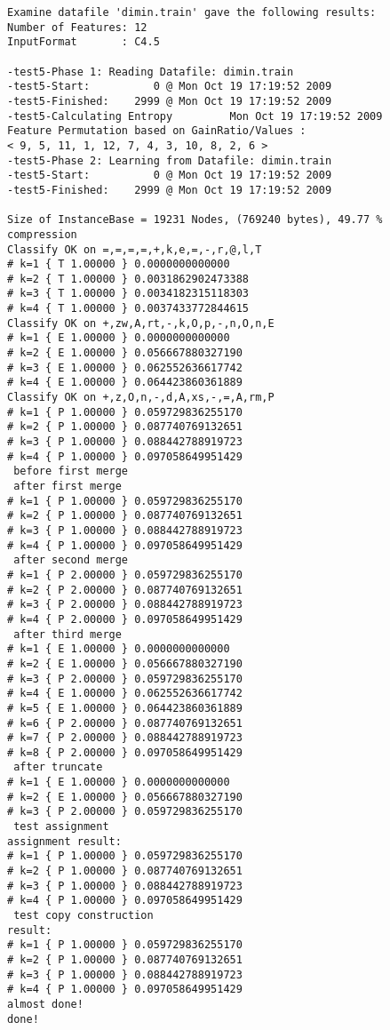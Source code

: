 \documentclass{report}
\begin{document}
\begin{footnotesize}
\begin{verbatim}
Examine datafile 'dimin.train' gave the following results:
Number of Features: 12
InputFormat       : C4.5

-test5-Phase 1: Reading Datafile: dimin.train
-test5-Start:          0 @ Mon Oct 19 17:19:52 2009
-test5-Finished:    2999 @ Mon Oct 19 17:19:52 2009
-test5-Calculating Entropy         Mon Oct 19 17:19:52 2009
Feature Permutation based on GainRatio/Values :
< 9, 5, 11, 1, 12, 7, 4, 3, 10, 8, 2, 6 >
-test5-Phase 2: Learning from Datafile: dimin.train
-test5-Start:          0 @ Mon Oct 19 17:19:52 2009
-test5-Finished:    2999 @ Mon Oct 19 17:19:52 2009

Size of InstanceBase = 19231 Nodes, (769240 bytes), 49.77 % compression
Classify OK on =,=,=,=,+,k,e,=,-,r,@,l,T
# k=1 { T 1.00000 } 0.0000000000000
# k=2 { T 1.00000 } 0.0031862902473388
# k=3 { T 1.00000 } 0.0034182315118303
# k=4 { T 1.00000 } 0.0037433772844615
Classify OK on +,zw,A,rt,-,k,O,p,-,n,O,n,E
# k=1 { E 1.00000 } 0.0000000000000
# k=2 { E 1.00000 } 0.056667880327190
# k=3 { E 1.00000 } 0.062552636617742
# k=4 { E 1.00000 } 0.064423860361889
Classify OK on +,z,O,n,-,d,A,xs,-,=,A,rm,P
# k=1 { P 1.00000 } 0.059729836255170
# k=2 { P 1.00000 } 0.087740769132651
# k=3 { P 1.00000 } 0.088442788919723
# k=4 { P 1.00000 } 0.097058649951429
 before first merge 
 after first merge 
# k=1 { P 1.00000 } 0.059729836255170
# k=2 { P 1.00000 } 0.087740769132651
# k=3 { P 1.00000 } 0.088442788919723
# k=4 { P 1.00000 } 0.097058649951429
 after second merge 
# k=1 { P 2.00000 } 0.059729836255170
# k=2 { P 2.00000 } 0.087740769132651
# k=3 { P 2.00000 } 0.088442788919723
# k=4 { P 2.00000 } 0.097058649951429
 after third merge 
# k=1 { E 1.00000 } 0.0000000000000
# k=2 { E 1.00000 } 0.056667880327190
# k=3 { P 2.00000 } 0.059729836255170
# k=4 { E 1.00000 } 0.062552636617742
# k=5 { E 1.00000 } 0.064423860361889
# k=6 { P 2.00000 } 0.087740769132651
# k=7 { P 2.00000 } 0.088442788919723
# k=8 { P 2.00000 } 0.097058649951429
 after truncate 
# k=1 { E 1.00000 } 0.0000000000000
# k=2 { E 1.00000 } 0.056667880327190
# k=3 { P 2.00000 } 0.059729836255170
 test assignment
assignment result: 
# k=1 { P 1.00000 } 0.059729836255170
# k=2 { P 1.00000 } 0.087740769132651
# k=3 { P 1.00000 } 0.088442788919723
# k=4 { P 1.00000 } 0.097058649951429
 test copy construction
result: 
# k=1 { P 1.00000 } 0.059729836255170
# k=2 { P 1.00000 } 0.087740769132651
# k=3 { P 1.00000 } 0.088442788919723
# k=4 { P 1.00000 } 0.097058649951429
almost done!
done!
\end{verbatim}
\end{footnotesize}
\clearpage
\end{document}
